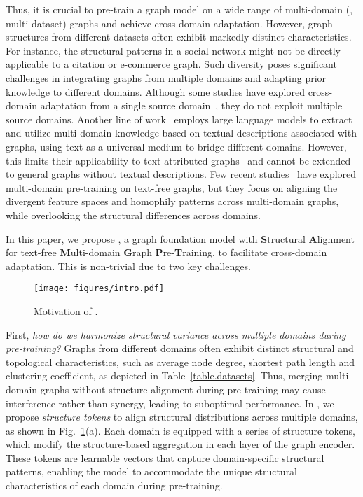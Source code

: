 Thus, it is crucial to pre-train a graph model on a wide range of multi-domain (\ie, multi-dataset) graphs and achieve cross-domain adaptation. However, graph structures from different datasets often exhibit markedly distinct characteristics. For instance, the structural patterns in a social network might not be directly applicable to a citation or e-commerce graph. 
Such diversity poses significant challenges in integrating graphs from multiple domains and adapting prior knowledge to different domains. Although some studies have explored cross-domain adaptation from a single source domain~\cite{ding2021cross,hassani2022cross,wang2021pre,wang2023cross,yang2019cross}, they do not exploit multiple  source domains. Another line of work~\cite{liu2023one,tang2024higpt,xia2024opengraph} employs large language models to extract and utilize multi-domain knowledge based on textual descriptions associated with graphs, using text as a universal medium to bridge different domains. However, this limits their applicability to text-attributed graphs~\cite{zhaolearning,wen2023augmenting} and cannot be extended to general graphs without textual descriptions. Few recent studies~\cite{zhao2024all,yu2024text} have explored multi-domain pre-training on text-free graphs, but they focus on aligning the divergent feature spaces and homophily patterns across multi-domain graphs, while overlooking the structural differences across  domains. 

In this paper, we propose \model, a graph foundation model with \textbf{S}tructural \textbf{A}lignment for text-free \textbf{M}ulti-domain \textbf{G}raph \textbf{P}re-\textbf{T}raining, to facilitate cross-domain adaptation. This is non-trivial due to two key challenges.

\begin{figure}[t]
\centering
\texttt{[image: figures/intro.pdf]}%
\vspace{-1mm}%
\caption{Motivation of \model.}
\label{fig.intro-motivation}
\end{figure}

First, \textit{how do we harmonize structural variance across multiple domains during pre-training?} 
Graphs from different domains often exhibit distinct structural and topological characteristics, such as average node degree, shortest path length and clustering coefficient, as depicted in Table~\ref{table.datasets}. %
Thus, merging multi-domain graphs without structure alignment during pre-training may cause interference rather than synergy, leading to suboptimal performance.
In \model, we propose \textit{structure tokens} to align structural distributions across multiple domains, as shown in Fig.~\ref{fig.intro-motivation}(a). Each domain is equipped with a series of structure tokens, which modify the structure-based aggregation in each layer of the graph encoder. These tokens are learnable vectors that capture domain-specific structural patterns, enabling the model to accommodate the unique structural characteristics of each domain during pre-training.


